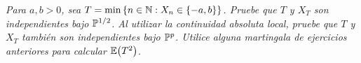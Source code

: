 \emph{
	Para $a,b>0$, sea $T=\min\left\{ n\in\mathbb{N}: X_n\in \left\{ -a,b\right\} \right\} $. 
	Pruebe que $T$ y $X_T$ son independientes bajo $ \mathbb{P} ^{1/2}$. Al utilizar 
	la continuidad absoluta local, pruebe que $T$ y $X_T$ tambi\'en son 
	independientes bajo $ \mathbb{P} ^p$. Utilice alguna martingala de ejercicios 
	anteriores para calcular $\mathbb{E}\! \left( T^2 \right)$.
}